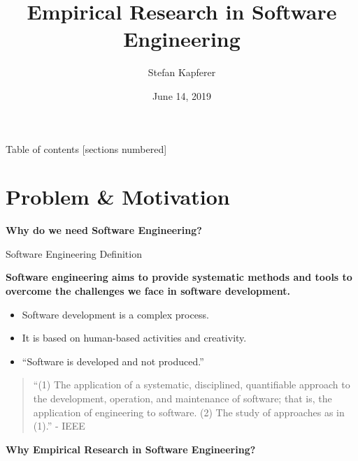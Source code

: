 \documentclass[10pt]{beamer}
\title{Empirical Research in Software Engineering}
\date{June 14, 2019}
\author{Stefan Kapferer}
\institute{University of Applied Sciences of Eastern Switzerland (HSR FHO)}
\begin{document}
\maketitle

\begin{frame}{Table of contents}
  [sections numbered]
  \tableofcontents[hideallsubsections]
\end{frame}

\section{Problem \& Motivation}

\begin{frame}[standout]
	
	\textbf{Why do we need Software Engineering?}
	
\end{frame}

\begin{frame}{Software Engineering Definition}
	
	\textbf{Software engineering aims to provide systematic methods and tools to overcome the challenges we face in software development.}
	
	\begin{itemize}
		\item Software development is a complex process.
		\item It is based on human-based activities and creativity.
		\item ``Software is developed and not produced.'' \cite{10-1007-3-540-57092-6-91}
	\end{itemize}

	\bigskip
	\begin{quotation}
		``(1) The application of a systematic, disciplined, quantifiable approach to the development, operation, and maintenance of software; that is, the application of engineering to software. (2) The study of approaches as in (1).'' - IEEE \cite{159342}
	\end{quotation}
\end{frame}

\begin{frame}[standout]
	
	\textbf{Why Empirical Research in Software Engineering?}
	
\end{frame}
\end{document}
